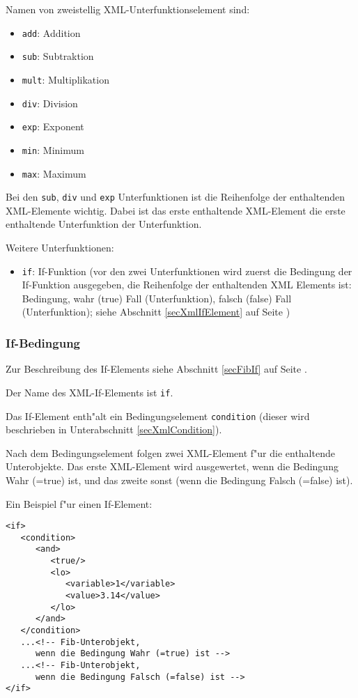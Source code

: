 \bigskip\noindent
Namen von zweistellig XML-Unterfunktionselement sind:
\begin{itemize}
 \item \verb|add|: Addition
 \item \verb|sub|: Subtraktion
 \item \verb|mult|: Multiplikation
 \item \verb|div|: Division
 \item \verb|exp|: Exponent
 \item \verb|min|: Minimum
 \item \verb|max|: Maximum
\end{itemize}
Bei den \verb|sub|, \verb|div| und \verb|exp| Unterfunktionen ist die Reihenfolge der enthaltenden XML-Elemente wichtig. Dabei ist das erste enthaltende XML-Element die erste enthaltende Unterfunktion der Unterfunktion.

\bigskip\noindent
Weitere Unterfunktionen:
\begin{itemize}
 \item \verb|if|: If-Funktion (vor den zwei Unterfunktionen wird zuerst die Bedingung der If-Funktion ausgegeben, die Reihenfolge der enthaltenden XML Elements ist: Bedingung, wahr (true) Fall (Unterfunktion), falsch (false) Fall (Unterfunktion); siehe Abschnitt   \ref{secXmlIfElement} auf Seite \pageref{secXmlIfElement})
\end{itemize}



\subsubsection{If-Bedingung}
\label{secXmlIfElement}

Zur Beschreibung des If-Elements siehe Abschnitt \ref{secFibIf} auf Seite \pageref{secFibIf} .

Der Name des XML-If-Elements ist \verb|if|.

Das If-Element enth"alt ein Bedingungselement \verb|condition| (dieser wird beschrieben in Unterabschnitt \ref{secXmlCondition}).

Nach dem Bedingungselement folgen zwei XML-Element f"ur die enthaltende Unterobjekte. Das erste XML-Element wird ausgewertet, wenn die Bedingung Wahr (=true) ist, und das zweite sonst (wenn die Bedingung Falsch (=false) ist).

\bigskip\noindent
Ein Beispiel f"ur einen If-Element:
\begin{verbatim}
<if>
   <condition>
      <and>
         <true/>
         <lo>
            <variable>1</variable>
            <value>3.14</value>
         </lo>
      </and>
   </condition>
   ...<!-- Fib-Unterobjekt,
      wenn die Bedingung Wahr (=true) ist -->
   ...<!-- Fib-Unterobjekt,
      wenn die Bedingung Falsch (=false) ist -->
</if>
\end{verbatim}


